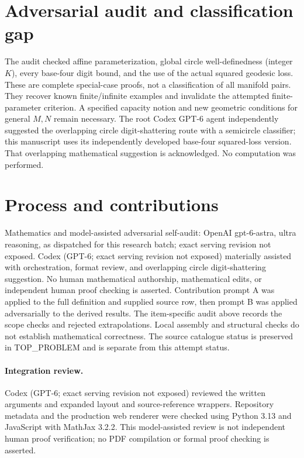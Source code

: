 \documentclass[11pt]{article}
\begin{document}
\section{Adversarial audit and classification gap}
The audit checked affine parameterization, global circle well-definedness
(integer $K$), every base-four digit bound, and the use of the actual squared
geodesic loss. These are complete special-case proofs, not a classification
of all manifold pairs. They recover known finite/infinite examples and
invalidate the attempted finite-parameter criterion. A specified capacity
notion and new geometric conditions for general $M,N$ remain necessary.
The root Codex GPT-6 agent independently suggested the overlapping circle digit-shattering route with a semicircle classifier; this manuscript uses its independently developed base-four squared-loss version. That overlapping mathematical suggestion is acknowledged. No computation was performed.

\section{Process and contributions}
Mathematics and model-assisted adversarial self-audit: OpenAI gpt-6-astra, ultra reasoning, as dispatched for this research batch; exact serving revision not exposed. Codex (GPT-6; exact serving revision not exposed) materially assisted with orchestration, format review, and overlapping circle digit-shattering suggestion. No human mathematical authorship, mathematical edits, or independent human proof checking is asserted.
Contribution prompt A was applied to the full definition and supplied source row, then prompt B was applied adversarially to the derived results. The item-specific audit above records the scope checks and rejected extrapolations. Local assembly and structural checks do not establish mathematical correctness. The source catalogue status is preserved in TOP\_PROBLEM and is separate from this attempt status.
\paragraph{Integration review.} Codex (GPT-6; exact serving revision not exposed) reviewed the written arguments and expanded layout and source-reference wrappers. Repository metadata and the production web renderer were checked using Python 3.13 and JavaScript with MathJax 3.2.2. This model-assisted review is not independent human proof verification; no PDF compilation or formal proof checking is asserted.
\end{document}
